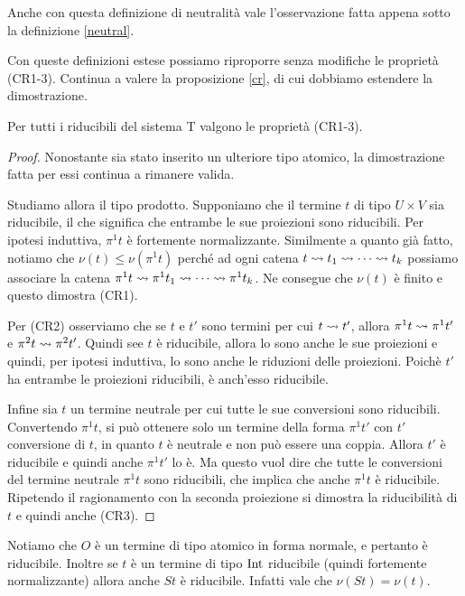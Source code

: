 \documentclass[]{marticle}
\begin{document}
Anche con questa definizione di neutralit\`a vale l'osservazione fatta appena
sotto la definizione \ref{neutral}.

Con queste definizioni estese possiamo riproporre senza modifiche le propriet\`a
(CR1-3). Continua a valere la proposizione \ref{cr}, di cui dobbiamo
estendere la dimostrazione.

\begin{block}[Proposizione]
    Per tutti i riducibili del sistema T valgono le propriet\`a (CR1-3).
\end{block}
\begin{proof}
    Nonostante sia stato inserito un ulteriore tipo atomico, la dimostrazione
    fatta per essi continua a rimanere valida.

    Studiamo allora il tipo prodotto. Supponiamo che il termine $t$ di tipo
    $U\times V$ sia riducibile, il che significa che entrambe le sue proiezioni
    sono riducibili. Per ipotesi induttiva, $\pi^1 t$ \`e fortemente
    normalizzante. Similmente a quanto gi\`a fatto, notiamo che $\nu(t)\leq
    \nu(\pi^1 t)$ perch\'e ad ogni catena $t \rightsquigarrow t_1 \rightsquigarrow \cdots \rightsquigarrow t_k$
    possiamo associare la catena $\pi^1 t \rightsquigarrow \pi^1 t_1\rightsquigarrow \cdots \rightsquigarrow
    \pi^1 t_k$. Ne consegue che $\nu(t)$ \`e finito e questo dimostra (CR1).

    Per (CR2) osserviamo che se $t$ e $t'$ sono termini per cui $t \rightsquigarrow t'$,
    allora $\pi^1 t \rightsquigarrow \pi^1 t'$ e $\pi^2 t \rightsquigarrow \pi^2 t'$. Quindi see $t$
    \`e riducibile, allora lo sono anche le sue proiezioni e quindi, per ipotesi
    induttiva, lo sono anche le riduzioni delle proiezioni. Poich\`e $t'$ ha
    entrambe le proiezioni riducibili, \`e anch'esso riducibile.

    Infine sia $t$ un termine neutrale per cui tutte le sue conversioni sono
    riducibili.  Convertendo $\pi^1 t$, si pu\`o ottenere solo un termine della
    forma $\pi^1 t'$ con $t'$ conversione di $t$, in quanto $t$ \`e neutrale e
    non pu\`o essere una coppia. Allora $t'$ \`e riducibile e quindi anche
    $\pi^1 t'$ lo \`e. Ma questo vuol dire che tutte le conversioni del termine
    neutrale $\pi^1 t$ sono riducibili, che implica che anche $\pi^1 t$ \`e
    riducibile. Ripetendo il ragionamento con la seconda proiezione si dimostra
    la riducibilit\`a di $t$ e quindi anche (CR3).
\end{proof}

Notiamo che $O$ \`e un termine di tipo atomico in forma normale, e pertanto \`e
riducibile. Inoltre se $t$ \`e un termine di tipo $\text{Int}$ riducibile (quindi
fortemente normalizzante) allora anche $St$ \`e riducibile. Infatti vale che
$\nu(St)=\nu(t)$.
\end{document}
